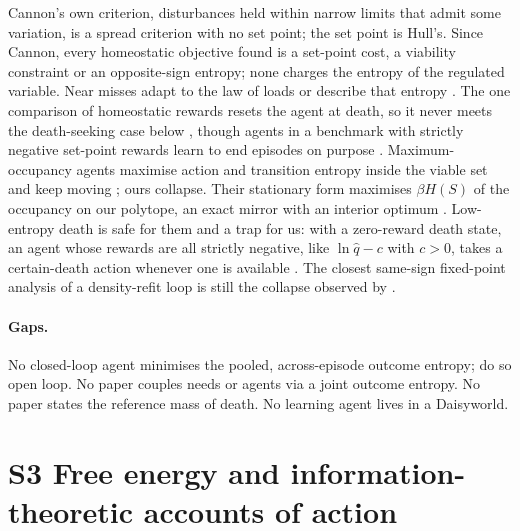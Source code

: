 \documentclass[10pt]{article}
\begin{document}
Cannon's own criterion, disturbances held within narrow limits that admit some variation, is a spread criterion with no set point; the set point is Hull's. Since Cannon, every homeostatic objective found is a set-point cost, a viability constraint or an opposite-sign entropy; none charges the entropy of the regulated variable. Near misses adapt to the law of loads \citep{Sterling-allostasis12} or describe that entropy \citep{Bartlett-assessing22}. The one comparison of homeostatic rewards resets the agent at death, so it never meets the death-seeking case below \citep{Yoshida-emergence24}, though agents in a benchmark with strictly negative set-point rewards learn to end episodes on purpose \citep{Lee-evaaa25}. Maximum-occupancy agents maximise action and transition entropy inside the viable set and keep moving \citep{Ramirez-Ruiz-complex22}; ours collapse. Their stationary form maximises $\beta H(S)$ of the occupancy on our polytope, an exact mirror with an interior optimum \citep{Grytskyy-general23}. Low-entropy death is safe for them and a trap for us: with a zero-reward death state, an agent whose rewards are all strictly negative, like $\ln\hat q - c$ with $c>0$, takes a certain-death action whenever one is available \citep{Martin-death16,Bertsekas-analysis91}. The closest same-sign fixed-point analysis of a density-refit loop is still the collapse observed by \citet{Yu-boredom18}.

\paragraph{Gaps.}
No closed-loop agent minimises the pooled, across-episode outcome entropy; \citet{Adurthi-minimum14} do so open loop. No paper couples needs or agents via a joint outcome entropy. No paper states the reference mass of death. No learning agent lives in a Daisyworld.

\section{S3 Free energy and information-theoretic accounts of action}
\end{document}
